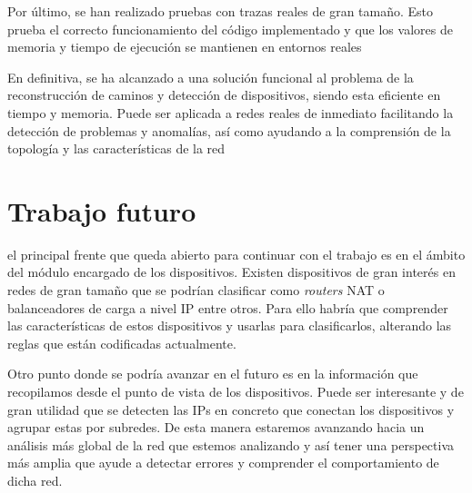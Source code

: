 \documentclass[twoside, 12pt]{epstfg}
\begin{document}
Por último, se han realizado pruebas con trazas reales de gran tamaño. Esto prueba el correcto funcionamiento del código implementado y que los valores de memoria y tiempo de ejecución se mantienen en entornos reales

En definitiva, se ha alcanzado a una solución funcional al problema de la reconstrucción de caminos y detección de dispositivos, siendo esta eficiente en tiempo y memoria. Puede ser aplicada a redes reales de inmediato facilitando la detección de problemas y anomalías, así como ayudando a la comprensión de la topología y las características de la red

\section{Trabajo futuro}
el principal frente que queda abierto para continuar con el trabajo es en el ámbito del módulo encargado de los dispositivos. Existen dispositivos de gran interés en redes de gran tamaño que se podrían clasificar como \textit{routers} NAT o balanceadores de carga a nivel IP entre otros. Para ello habría que comprender las características de estos dispositivos y usarlas para clasificarlos, alterando las reglas que están codificadas actualmente.

Otro punto donde se podría avanzar en el futuro es en la información que recopilamos desde el punto de vista de los dispositivos. Puede ser interesante y de gran utilidad que se detecten las IPs en concreto que conectan los dispositivos y agrupar estas por subredes. De esta manera estaremos avanzando hacia un análisis más global de la red que estemos analizando y así tener una perspectiva más amplia que ayude a detectar errores y comprender el comportamiento de dicha red.

\backmatter
\appendix

\cleardoublepage

\nocite{*}
{}

\cleardoublepage
\printindex
\end{document}
